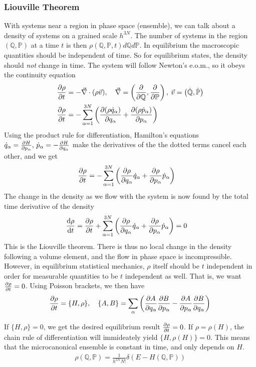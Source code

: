 \documentclass[a4paper, english, 12pt]{article}
\newcommand{\closed}[1]{\left( #1 \right)}
\newcommand{\curly}[1]{\{ #1 \} }
\newcommand{\Q}{\mathbb{Q}}
\renewcommand{\P}{\mathbb{P}}
\begin{document}
\begin{multicols*}{2}
\subsubsection*{\scriptsize Liouville Theorem}
With systems near a region in phase space (ensemble), we can talk about a density of systems on a grained scale $h^{3N}$. The number of systems in the region $(\Q,\P)$ at a time $t$ is then $\rho(\Q,\P,t)d\Q d\P$. In equilibrium the macroscopic quantities should be independent of time. So for equilibrium states, the density should \textit{not} change in time. The system will follow Newton's e.o.m., so it obeys the continuity equation 
\begin{align*}
    \pdv{\rho}{t} &= -\vec{\nabla} \cdot (\rho \vec{v}),\quad \vec{\nabla}=\closed{\pdv{\Q},\pdv{\P}},\: \vec{v}=\closed{\dot{\Q},\dot{\P}} \\ 
    \pdv{\rho}{t} &= -\sum_{\alpha=1}^{3N}\closed{\pdv{(\rho\dot{q}_\alpha)}{q_\alpha} + \pdv{(\rho\dot{p}_\alpha)}{p_\alpha} }
\end{align*} 
Using the product rule for differentiation, Hamilton's equations $\dot{q}_\alpha=\pdv{H}{p_\alpha},\,\dot{p}_\alpha=-\pdv{H}{q_\alpha}$ make the derivatives of the the dotted terms cancel each other, and we get 
\begin{align*}
    \pdv{\rho}{t} &= -\sum_{\alpha=1}^{3N} \closed{\pdv{\rho}{q_\alpha} \dot{q}_\alpha + \pdv{\rho}{p_\alpha}\dot{p}_\alpha }
\end{align*}  
The change in the density as we flow with the system is now found by the total time derivative of the density 
\begin{align*}
    \dv{\rho}{t} &= \pdv{\rho}{t} + \sum_{\alpha=1}^{3N} \closed{\pdv{\rho}{q_\alpha} \dot{q}_\alpha + \pdv{\rho}{p_\alpha}\dot{p}_\alpha } = 0
\end{align*}
This is the Liouville theorem. There is thus no local change in the density following a volume element, and the flow in phase space is incompressible. However, in equilibrium statistical mechanics, $\rho$ itself should be $t$ independent in order for measurable quantities to be $t$ independent as well. That is, we want $\pdv{\rho}{t}=0$. Using Poisson brackets, we then have 
\begin{align*}
    \pdv{\rho}{t} = \curly{H,\rho},\quad \curly{A,B}=\sum_\alpha \closed{\pdv{A}{q_\alpha}\pdv{B}{p_\alpha} - \pdv{A}{p_\alpha}\pdv{B}{q_\alpha}} 
\end{align*}

If $\curly{H,\rho}=0$, we get the desired equilibrium result $\pdv{\rho}{t}=0$. If $\rho=\rho(H)$, the chain rule of differentiation will immideately yield $\curly{H,\rho(H)}=0$. This means that the microcanonical ensemble is constant in time, and only depends on $H$. 
\begin{align*}
    \rho(\Q,\P) = \frac{1}{h^{3N} N!} \delta\closed{E-H(\Q,\P)}
\end{align*}



\end{multicols*}
\end{document}
